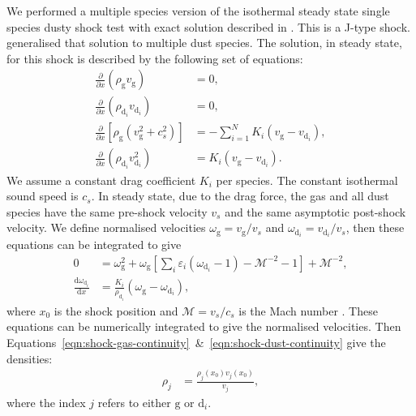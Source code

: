 \documentclass[fleqn,usenatbib]{mnras}
\newcommand{\g}{\mathrm{g}}
\newcommand{\dd}{\mathrm{d}}
\begin{document}
We performed a multiple species version of the isothermal steady state single
species dusty shock test with exact solution described in
\citet{Lehmann2018MNRAS.476.3185L}. This is a J-type shock.
\citet{Benitez-Llambay2019ApJS..241...25B} generalised that solution to multiple
dust species. The solution, in steady state, for this shock is described by the
following set of equations:
%
\begin{align}
   \frac{\partial}{\partial x} \left( \rho_{\g} v_{\g} \right)
      &= 0, \label{eqn:shock-gas-continuity} \\
   \frac{\partial}{\partial x} \left( \rho_{\dd_i} v_{\dd_i} \right)
      &= 0, \label{eqn:shock-dust-continuity} \\
   \frac{\partial}{\partial x} \left[ \rho_{\g} (v_{\g}^2 + c_s^2)\right]
      &= - \sum_{i=1}^N K_i (v_{\g} - v_{\dd_i}), \\
   \frac{\partial}{\partial x} \left( \rho_{\dd_i} v_{\dd_i}^2 \right)
      &= K_i (v_{\g} - v_{\dd_i}).
\end{align}
%
We assume a constant drag coefficient \(K_i\) per species. The constant
isothermal sound speed is \(c_s\). In steady state, due to the drag force, the
gas and all dust species have the same pre-shock velocity \(v_s\) and the same
asymptotic post-shock velocity. We define normalised velocities \(\omega_{\g} =
v_{\g} / v_s\) and \(\omega_{\dd_i} = v_{\dd_i} / v_s\), then these equations
can be integrated to give
%
\begin{align}
   0 &= \omega_{\g}^2 + \omega_{\g} \left[ \sum_i \varepsilon_i (\omega_{\dd_i} - 1)
      - \mathcal{M}^{-2} -1 \right] + \mathcal{M}^{-2}, \\
   \frac{\dd \omega_{\dd_i}}{\dd x} &= \frac{K_i}{\rho_{\dd_i}}
      \left( \omega_{\g} - \omega_{\dd_i} \right),
\end{align}
%
where \(x_0\) is the shock position and \(\mathcal{M} = v_s / c_s\) is the Mach
number \citep{Benitez-Llambay2019ApJS..241...25B}. These equations can be
numerically integrated to give the normalised velocities. Then
Equations~\ref{eqn:shock-gas-continuity}~\&~\ref{eqn:shock-dust-continuity} give
the densities:
%
\begin{align}
   \rho_j &= \frac{\rho_j(x_0) v_j(x_0)}{v_j},
\end{align}
%
where the index \(j\) refers to either \(\g\) or \(\dd_i\).
\end{document}
